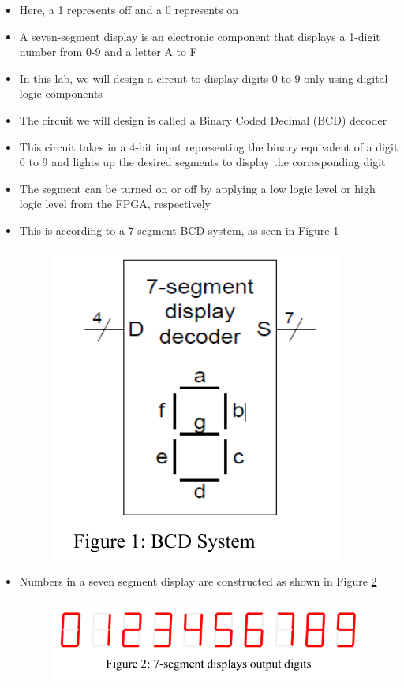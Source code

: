 \begin{itemize}
    \item Here, a 1 represents off and a 0 represents on

    \item A seven-segment display is an electronic component that displays a 1-digit number from 0-9 and a letter A to F

    \item In this lab, we will design a circuit to display digits 0 to 9 only using digital logic components

    \item The circuit we will design is called a Binary Coded Decimal (BCD) decoder 
      
    \item This circuit takes in a 4-bit input representing the binary equivalent of a digit 0 to 9 and lights up the desired segments to display the corresponding digit 
      
    \item The segment can be turned on or off by applying a low logic level or high logic level from the FPGA, respectively

    \item This is according to a 7-segment BCD system, as seen in Figure \ref{fig:1}

      \begin{figure}[h!]
        \centering
        \includegraphics[width=.3\textwidth]{Figures/BCD.png}
        \label{fig:1}
      \end{figure}

      \newpage

    \item Numbers in a seven segment display are constructed as shown in Figure \ref{fig:2}

      \begin{figure}[h!]
        \centering
        \includegraphics[width=.85\textwidth]{Figures/7SD.png}
        \label{fig:2}
      \end{figure}


\end{itemize}
